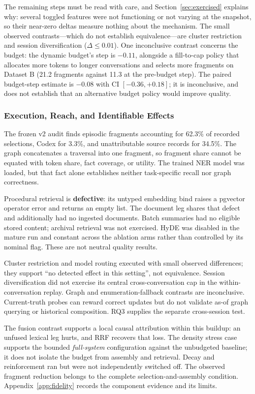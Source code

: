 \documentclass[twoside,11pt]{article}
\begin{document}
The remaining steps must be read with care, and Section~\ref{sec:exercised} explains why: several toggled features were not functioning or not varying at the snapshot, so their near-zero deltas measure nothing about the mechanism. The small observed contrasts---which do not establish equivalence---are cluster restriction and session diversification ($\Delta \leq 0.01$). One inconclusive contrast concerns the budget: the dynamic budget's step is $-0.11$, alongside a fill-to-cap policy that allocates more tokens to longer conversations and selects more fragments on Dataset B (21.2 fragments against 11.3 at the pre-budget step). The paired budget-step estimate is $-0.08$ with CI $[-0.36,+0.18]$; it is inconclusive, and does not establish that an alternative budget policy would improve quality.

\subsubsection{Execution, Reach, and Identifiable Effects}
\label{sec:carried}\label{sec:exercised}
The frozen v2 audit finds episodic fragments accounting for 62.3\% of recorded selections, Codex for 3.3\%, and unattributable source records for 34.5\%. The graph concatenates a traversal into one fragment, so fragment share cannot be equated with token share, fact coverage, or utility. The trained NER model was loaded, but that fact alone establishes neither task-specific recall nor graph correctness.

Procedural retrieval is \textbf{defective}: its untyped embedding bind raises a pgvector operator error and returns an empty list. The document leg shares that defect and additionally had no ingested documents. Batch summaries had no eligible stored content; archival retrieval was not exercised. HyDE was disabled in the mature run and constant across the ablation arms rather than controlled by its nominal flag. These are not neutral quality results.

Cluster restriction and model routing executed with small observed differences; they support ``no detected effect in this setting'', not equivalence. Session diversification did not exercise its central cross-conversation cap in the within-conversation replay. Graph and enumeration-fallback contrasts are inconclusive. Current-truth probes can reward correct updates but do not validate as-of graph querying or historical composition. RQ3 supplies the separate cross-session test.

The fusion contrast supports a local causal attribution within this buildup: an unfused lexical leg hurts, and RRF recovers that loss. The density stress case supports the bounded \emph{full-system} configuration against the unbudgeted baseline; it does not isolate the budget from assembly and retrieval. Decay and reinforcement ran but were not independently switched off. The observed fragment reduction belongs to the complete selection-and-assembly condition. Appendix~\ref{app:fidelity} records the component evidence and its limits.
\end{document}
